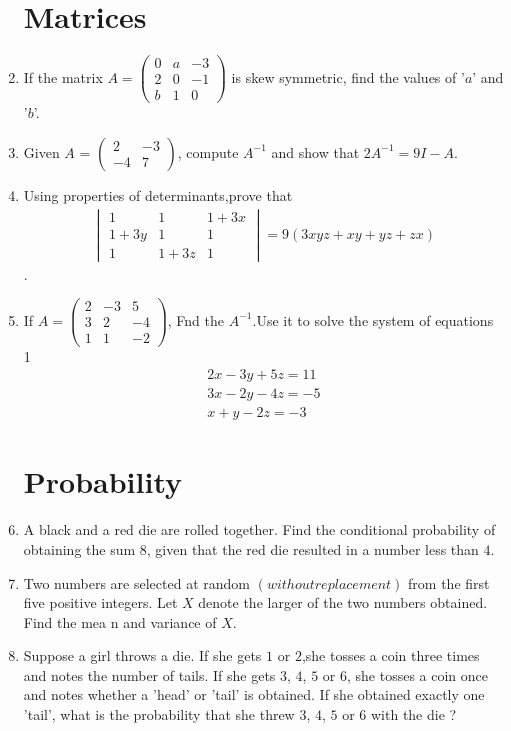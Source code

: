 \documentclass[10pt,-letter paper]{article}
\providecommand{\brak}[1]{\ensuremath{\left(#1\right)}}
\newcommand{\myvec}[1]{\ensuremath{\begin{pmatrix}#1\end{pmatrix}}}
\newcommand{\mydet}[1]{\ensuremath{\begin{vmatrix}#1\end{vmatrix}}}
\begin{document}
\begin{enumerate}
\section{Matrices}	
\item  If the matrix $A = \myvec{ 0 & a & -3 \\ 2 & 0 & -1 \\ b & 1 & 0 }$ is skew symmetric, find the values of '$a$' and '$b$'.
\item Given $A$ = $\myvec{ 2 & -3 \\ -4 & 7 }$, compute $A^{-1}$ and show that $2A^{-1} = 9I-A$.
\item Using properties of determinants,prove that         \begin{align*}                                           \mydet{1 & 1 & 1+3x \\ 1+3y & 1 & 1 \\ 1 & 1+3z & 1 }=9\brak{3xyz+xy+yz+zx}                                        \end{align*}.
\item If $A=\myvec{2 & -3 & 5 \\ 3 & 2 & -4 \\ 1 & 1 & -2}$, Fnd the $A^{-1}$.Use it to solve the system of equations                                                        1\begin{align*}                                            2x-3y+5z=11 \\                           
3x-2y-4z=-5\\
x+y-2z=-3                                 
\end{align*}




\section{Probability}
\item A black and a red die are rolled together. Find the conditional probability of obtaining the sum $8$, given that the red die resulted in a number less than $4$.
\item Two numbers are selected at random \brak{without replacement} from the first five positive integers. Let $X$ denote the larger of the two numbers obtained. Find the mea n and variance of $X$.
\item  Suppose a girl throws a die. If she gets $1$ or $2$,she tosses a coin three times and notes the number of tails. If she gets $3$, $4$, $5$ or $6$, she tosses a coin once and notes whether a 'head' or 'tail' is obtained. If she obtained exactly one 'tail', what is the probability that she threw $3$, $4$, $5$ or $6$ with the die ?




\end{enumerate}
\end{document}
